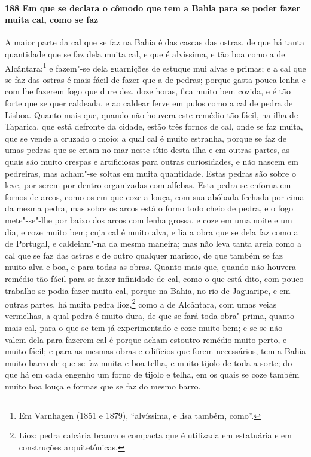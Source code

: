 \paragraph{188 Em que se declara o cômodo que tem a Bahia para se poder fazer muita cal,
como se faz}

A maior parte da cal que se faz na Bahia é das cascas das ostras, de que há tanta
quantidade que se faz dela muita cal, e que é alvíssima, e tão boa como a de
Alcântara;\footnote{ Em Varnhagen (1851 e 1879), ``alvíssima, e lisa também, como''.} e
fazem"-se dela guarnições de estuque mui alvas e primas; e a cal que se faz das ostras é
mais fácil de fazer que a de pedras; porque gasta pouca lenha e com lhe fazerem fogo que
dure dez, doze horas, fica muito bem cozida, e é tão forte que se quer caldeada, e ao
caldear ferve em pulos como a cal de pedra de Lisboa. Quanto mais que, quando não houvera
este remédio tão fácil, na ilha de Taparica, que está defronte da cidade, estão três
fornos de cal, onde se faz muita, que se vende a cruzado o moio; a qual cal é muito
estranha, porque se faz de umas pedras que se criam no mar neste sítio desta ilha e em
outras partes, as quais são muito crespas e artificiosas para outras curiosidades, e não
nascem em pedreiras, mas acham"-se soltas em muita quantidade. Estas pedras são sobre o
leve, por serem por dentro organizadas com alfebas. Esta pedra se enforna em fornos de
arcos, como os em que coze a louça, com sua abóbada fechada por cima da mesma pedra, mas
sobre os arcos está o forno todo cheio de pedra, e o fogo mete"-se"-lhe por baixo dos arcos
com lenha grossa, e coze em uma noite e um dia, e coze muito bem; cuja cal é muito alva, e
lia a obra que se dela faz como a de Portugal, e caldeiam"-na da mesma maneira; mas não
leva tanta areia como a cal que se faz das ostras e de outro qualquer marisco, de que
também se faz muito alva e boa, e para todas as obras. Quanto mais que, quando não houvera
remédio tão fácil para se fazer infinidade de cal, como o que está dito, com pouco
trabalho se podia fazer muita cal, porque na Bahia, no rio de Jaguaripe, e em outras
partes, há muita pedra lioz,\footnote{ Lioz: pedra calcária branca e compacta que é
utilizada em estatuária e em construções arquitetônicas.} como a de Alcântara, com umas
veias vermelhas, a qual pedra é muito dura, de que se fará toda obra"-prima, quanto mais
cal, para o que se tem já experimentado e coze muito bem; e se se não valem dela para
fazerem cal é porque acham estoutro remédio muito perto, e muito fácil; e para as mesmas
obras e edifícios que forem necessários, tem a Bahia muito barro de que se faz muita e boa
telha, e muito tijolo de toda a sorte; do que há em cada engenho um forno de tijolo e
telha, em os quais se coze também muito boa louça e formas que se faz do mesmo barro.

